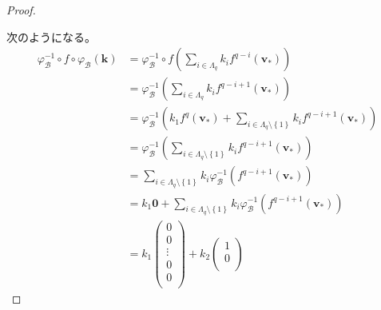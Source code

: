 \documentclass[dvipdfmx]{jsarticle}
\begin{document}
\begin{proof}
\begin{center}
\end{center}
次のようになる。
\begin{align*}
\varphi_{\mathcal{B}}^{- 1} \circ f \circ \varphi_{\mathcal{B}}\left( \mathbf{k} \right) &= \varphi_{\mathcal{B}}^{- 1} \circ f\left( \sum_{i \in \varLambda_{q}} {k_{i}f^{q - i}\left( \mathbf{v}_{*} \right)} \right)\\
&= \varphi_{\mathcal{B}}^{- 1}\left( \sum_{i \in \varLambda_{q}} {k_{i}f^{q - i + 1}\left( \mathbf{v}_{*} \right)} \right)\\
&= \varphi_{\mathcal{B}}^{- 1}\left( k_{1}f^{q}\left( \mathbf{v}_{*} \right) + \sum_{i \in \varLambda_{q} \setminus \left\{ 1 \right\}} {k_{i}f^{q - i + 1}\left( \mathbf{v}_{*} \right)} \right)\\
&= \varphi_{\mathcal{B}}^{- 1}\left( \sum_{i \in \varLambda_{q} \setminus \left\{ 1 \right\}} {k_{i}f^{q - i + 1}\left( \mathbf{v}_{*} \right)} \right)\\
&= \sum_{i \in \varLambda_{q} \setminus \left\{ 1 \right\}} {k_{i}\varphi_{\mathcal{B}}^{- 1}\left( f^{q - i + 1}\left( \mathbf{v}_{*} \right) \right)}\\
&= k_{1}\mathbf{0} + \sum_{i \in \varLambda_{q} \setminus \left\{ 1 \right\}} {k_{i}\varphi_{\mathcal{B}}^{- 1}\left( f^{q - i + 1}\left( \mathbf{v}_{*} \right) \right)}\\
&= k_{1}\begin{pmatrix}
0 \\
0 \\
 \vdots \\
0 \\
0 \\
\end{pmatrix} + k_{2}\begin{pmatrix}
1 \\
0 \\

\end{pmatrix}
\end{align*}
\end{proof}
\end{document}
